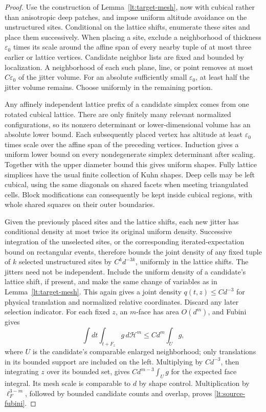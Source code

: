 \documentclass[11pt]{article}
\numberwithin{equation}{section}
\theoremstyle{definition}
\theoremstyle{remark}
\newcommand{\cH}{\mathcal H}
\begin{document}
\begin{proof}
Use the construction of Lemma~\ref{lt:target-mesh}, now with
cubical rather than anisotropic deep patches, and impose
uniform altitude avoidance on the unstructured sites.  Conditional
on the lattice shifts, enumerate these sites and place them
successively.  When placing a site, exclude a neighborhood of
thickness $\varepsilon_0$ times its scale around the affine span
of every nearby tuple of at most three earlier or lattice
vertices.  Candidate neighbor lists are fixed and bounded by
localization.  A neighborhood of each such plane, line, or
point removes at most $C\varepsilon_0$ of the jitter volume.
For an absolute sufficiently small $\varepsilon_0$, at least
half the jitter volume remains.  Choose uniformly in the
remaining portion.

Any affinely independent lattice prefix of a candidate simplex
comes from one rotated cubical lattice.  There are only finitely
many relevant normalized configurations, so its nonzero
determinant or lower-dimensional volume has an absolute lower
bound.  Each subsequently placed vertex has altitude at least
$\varepsilon_0$ times scale over the affine span of the preceding
vertices.  Induction gives a uniform lower bound on every
nondegenerate simplex determinant after scaling.  Together with
the upper diameter bound this gives uniform shapes.  Fully
lattice simplices have the usual finite collection of Kuhn
shapes.  Deep cells may be left cubical, using the same
diagonals on shared facets when meeting triangulated cells.
Block modifications can consequently be kept inside cubical
regions, with whole shared squares on their outer boundaries.

Given the previously placed sites and the lattice shifts, each
new jitter has conditional density at most twice its original
uniform density.  Successive integration of the unselected sites,
or the corresponding iterated-expectation bound on rectangular
events, therefore bounds the joint density of any fixed tuple of
$k$ selected unstructured sites by $C^k d^{-3k}$, uniformly in
the lattice shifts.  The jitters need not be independent.  Include the uniform density of a candidate's lattice shift, if
present, and make the same change of variables as in
Lemma~\ref{lt:target-mesh}.  This again gives a joint density
$q(t,z)\leq Cd^{-3}$ for physical translation and normalized
relative coordinates.  Discard any later selection indicator.
For each fixed $z$, an $m$-face has area $O(d^m)$, and Fubini gives
\[
 \int dt\int_{t+F_z}g\,d\cH^m
       \leq Cd^m\int_{U}g,
\]
where $U$ is the candidate's comparable enlarged neighborhood;
only translations in its bounded support are included on the
left.  Multiplying by $Cd^{-3}$, then integrating $z$ over its
bounded set, gives $Cd^{m-3}\int_U g$ for the expected face
integral.  Its mesh scale is comparable to $d$ by shape control.
Multiplication by $\ell_F^{3-m}$, followed by bounded candidate
counts and overlap, proves \eqref{lt:source-fubini}.


\end{proof}
\end{document}
